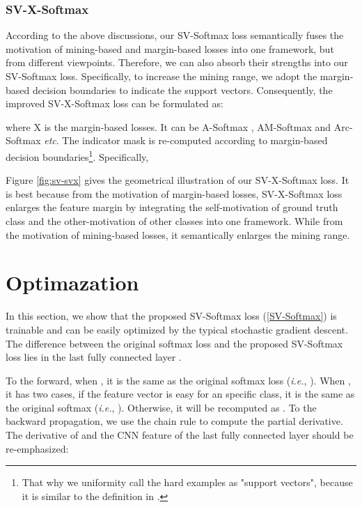 \documentclass[10pt,twocolumn,letterpaper]{article}
\begin{document}
\subsubsection{SV-X-Softmax}
According to the above discussions, our SV-Softmax loss semantically fuses the motivation of mining-based and margin-based losses into one framework, but from different viewpoints. Therefore, we can also absorb their strengths into our SV-Softmax loss. Specifically, to increase the mining range, we adopt the margin-based decision boundaries to indicate the support vectors. Consequently, the improved SV-X-Softmax loss can be formulated as:

where X is the margin-based losses. It can be A-Softmax \cite{SphereFace}, AM-Softmax \cite{AM-Softmax} and Arc-Softmax \cite{Arc-Softmax} \textit{etc}. The indicator mask  is re-computed according to margin-based decision boundaries\footnote{That why we uniformity call the hard examples as "support vectors", because it is similar to the definition in \cite{cortes1995support}.}. Specifically,

Figure \ref{fig:sv-svx} gives the geometrical illustration of our SV-X-Softmax loss. It is best because from the motivation of margin-based losses, SV-X-Softmax loss enlarges the feature margin by integrating the self-motivation of ground truth class and the other-motivation of other classes into one framework. While from the motivation of mining-based losses, it semantically enlarges the mining range.

\section{Optimazation}
In this section, we show that the proposed SV-Softmax loss (\ref{SV-Softmax}) is trainable and can be easily optimized by the typical stochastic gradient descent. The difference between the original softmax loss and the proposed SV-Softmax loss lies in the last fully connected layer
.



To the forward, when , it is the same as the original softmax loss (\textit{i.e.}, ). When , it has two cases, if the feature vector is easy for an specific class, it is the same as the original softmax (\textit{i.e.},  ). Otherwise, it will be recomputed as . To the backward propagation, we use the chain rule to compute the partial derivative. The derivative of  and the CNN feature  of the last fully connected layer should be re-emphasized:
\end{document}
